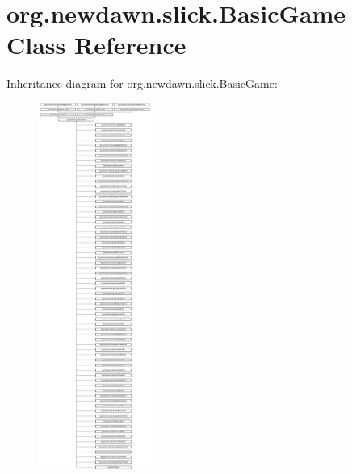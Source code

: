\hypertarget{classorg_1_1newdawn_1_1slick_1_1_basic_game}{}\section{org.\+newdawn.\+slick.\+Basic\+Game Class Reference}
\label{classorg_1_1newdawn_1_1slick_1_1_basic_game}
Inheritance diagram for org.\+newdawn.\+slick.\+Basic\+Game\+:\begin{figure}[H]
\begin{center}
\leavevmode
\includegraphics[height=12.000000cm]{classorg_1_1newdawn_1_1slick_1_1_basic_game}
\end{center}
\end{figure}

